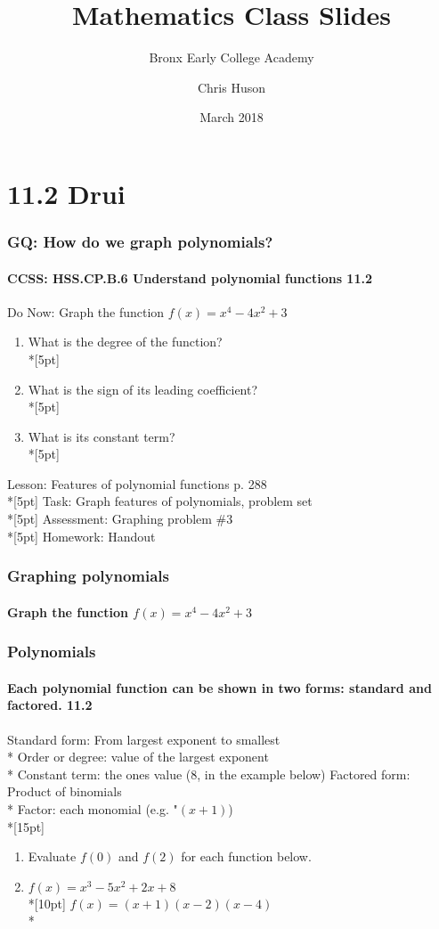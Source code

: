 \documentclass{beamer}
\title{Mathematics Class Slides}
\subtitle{Bronx Early College Academy}
\author{Chris Huson}
\date{March 2018}
\begin{document}
\frame{\titlepage}


\section{11.2 Drui}
\frame
{
  \frametitle{GQ: How do we graph polynomials?}
  \framesubtitle{CCSS: HSS.CP.B.6 Understand polynomial functions \qquad \qquad \qquad \alert{11.2}}

  \begin{block}{Do Now: Graph the function $f(x)=x^4-4x^2+3$}
  \begin{enumerate}
    \item What is the degree of the function?\\*[5pt]
    \item What is the sign of its leading coefficient?\\*[5pt]
    \item What is its constant term?\\*[5pt]
  \end{enumerate}
  \end{block}
  Lesson: Features of polynomial functions p. 288\\*[5pt]
  Task: Graph features of polynomials, problem set\\*[5pt]
  Assessment: Graphing problem \#3\\*[5pt]
  Homework: Handout 
}

\frame
{
  \frametitle{Graphing polynomials}
  \framesubtitle{Graph the function $f(x)=x^4-4x^2+3$}
  

}

\frame
{
  \frametitle{Polynomials}
  \framesubtitle{Each polynomial function can be shown in two forms: standard and factored. \qquad \qquad \qquad \alert{11.2}}
\alert{Standard form}: From largest exponent to smallest\\*
\qquad \alert{Order or degree}: value of the largest exponent\\*
\qquad \alert{Constant term}: the ones value (8, in the example below)
\alert{Factored form}: Product of binomials\\*
\qquad \alert{Factor}: each monomial (e.g. "$(x+1)$)\\*[15pt]
  \begin{enumerate}
    \item Evaluate $f(0)$ and $f(2)$ for each function below.
      \item $f(x)=x^3-5x^2+2x+8$ \qquad \\*[10pt]
      $f(x)=(x+1)(x-2)(x-4)$\\*

  \end{enumerate}
}
\end{document}
